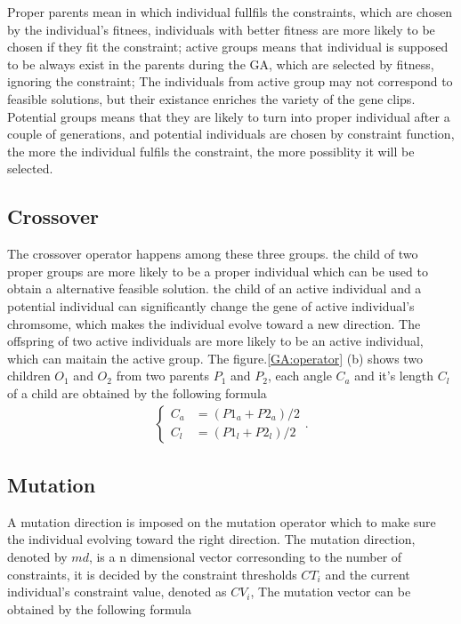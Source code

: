 Proper parents mean in which individual fullfils the constraints, which are
chosen by the individual's fitnees, individuals with better fitness are more
likely to be chosen if they fit the constraint; active groups means that
individual is supposed to be always exist in the parents during the GA, which
are selected by fitness, ignoring the constraint; The individuals from active
group may not correspond to feasible solutions, but their existance enriches the
variety of the gene clips.  Potential groups means that they are likely to turn
into proper individual after a couple of generations, and potential individuals
are chosen by constraint function, the more the individual fulfils the
constraint, the more possiblity it will be selected.

\subsection{Crossover}
The crossover operator happens among these three groups. the child of two proper
groups are more likely to be a proper individual which can be used to obtain a
alternative feasible solution. the child of an active individual and a potential
individual can significantly change the gene of active individual's chromsome,
which makes the individual evolve toward a new direction. The offspring of two
active individuals are more likely to be an active individual, which can maitain
the active group.  The figure.\ref{GA:operator} (b) shows two children $O_1$
and $O_2$ from two parents $P_1$ and $P_2$, each angle $C_a$ and it's length 
$C_l$ of a child are obtained by the following formula
\begin{align} 
	\begin{cases}
	C_a &= (P1_a + P2_a)/2 \\
	C_l &= (P1_l + P2_l)/2 
\end{cases} \textstyle{.}
\end{align}

\subsection{Mutation}
A mutation direction is imposed on the mutation operator which to make sure the
individual evolving toward the right direction. The mutation direction, denoted
by $md$, is a n dimensional vector corresonding to the number of constraints, it
is decided by the constraint thresholds $CT_i$ and the current individual's
constraint value, denoted as $CV_i$,  The mutation vector can be obtained by the
following formula

